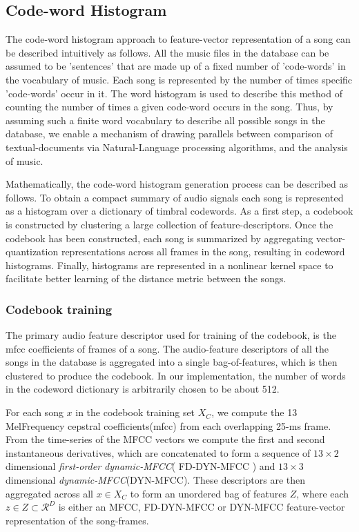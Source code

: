 \documentclass[10pt]{article}
\begin{document}
\subsection{Code-word Histogram}
The code-word histogram \cite{codewordHist} approach to feature-vector representation of a song can be described intuitively as follows. All the music files in the database can be assumed to be 'sentences' that are made up of a fixed number of 'code-words' in the vocabulary of music. Each song is represented by the number of times specific 'code-words' occur in it. The word histogram is used to describe this method of counting the number of times a given code-word occurs in the song. Thus, by assuming such a finite word vocabulary to describe all possible songs in the database, we enable a  mechanism of drawing parallels between comparison of textual-documents via Natural-Language processing algorithms, and the analysis of music. 

Mathematically, the code-word histogram generation process can be described as follows. To obtain a compact summary of audio signals each song is represented as a histogram over a dictionary of timbral codewords. As a first step, a codebook is constructed by clustering a large collection of feature-descriptors. Once the codebook has been constructed, each song is summarized by aggregating vector-quantization representations across all frames in the song, resulting in codeword histograms. Finally, histograms are represented in a nonlinear kernel space to facilitate better learning of the distance metric between the songs. 

\subsubsection{Codebook training}
The primary audio feature descriptor used for training of the codebook, is the mfcc coefficients of frames of a song. The audio-feature descriptors of all the songs in the database is aggregated into a single bag-of-features, which is then clustered to produce the codebook. In our implementation, the number of words in the codeword dictionary is arbitrarily chosen to be about 512. 

For each song $x$ in the codebook training set $X_C$, we compute the 13 MelFrequency cepstral coefficients(mfcc) from each overlapping 25-ms frame. From the time-series of the MFCC vectors we compute the first and second instantaneous derivatives, which are concatenated to form a sequence of $13 \times 2$ dimensional \emph{first-order dynamic-MFCC}( FD-DYN-MFCC ) and $13\times 3$ dimensional \emph{dynamic-MFCC}(DYN-MFCC). These descriptors are then aggregated across all $x \in X_C$ to form an unordered bag of features $Z$, where each $ z \in Z \subset \mathcal{R}^D $ is either an MFCC, FD-DYN-MFCC or DYN-MFCC feature-vector representation of the song-frames.
\end{document}
